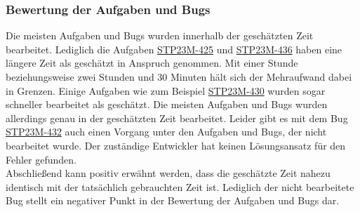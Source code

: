 \subsubsection{Bewertung der Aufgaben und Bugs}
Die meisten Aufgaben und Bugs wurden innerhalb der geschätzten Zeit bearbeitet. Lediglich die Aufgaben \hyperlink{S425}{STP23M-425} und \hyperlink{S436}{STP23M-436} haben eine längere Zeit als geschätzt in Anspruch genommen. Mit einer Stunde beziehungsweise zwei Stunden und 30 Minuten hält sich der Mehraufwand dabei in Grenzen. Einige Aufgaben wie zum Beispiel \hyperlink{S430}{STP23M-430} wurden sogar schneller bearbeitet als geschätzt. Die meisten Aufgaben und Bugs wurden allerdings genau in der geschätzten Zeit bearbeitet. Leider gibt es mit dem Bug \hyperlink{S432}{STP23M-432} auch einen Vorgang unter den Aufgaben und Bugs, der nicht bearbeitet wurde. Der zuständige Entwickler hat keinen Lösungsansatz für den Fehler gefunden. \\
Abschließend kann positiv erwähnt werden, dass die geschätzte Zeit nahezu identisch mit der tatsächlich gebrauchten Zeit ist. Lediglich der nicht bearbeitete Bug stellt ein negativer Punkt in der Bewertung der Aufgaben und Bugs dar.